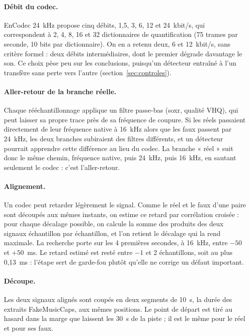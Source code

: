 \documentclass[a4paper, 11pt]{article}
\begin{document}
\paragraph{Débit du codec.} EnCodec 24~kHz propose cinq débits, 1,5, 3, 6, 12 et 24~kbit/s, qui correspondent à
2, 4, 8, 16 et 32 dictionnaires de quantification (75 trames par seconde, 10 bits par dictionnaire). On en a
retenu deux, 6 et 12~kbit/s, sans critère formel : deux débits intermédiaires, dont le premier dégrade davantage
le son. Ce choix pèse peu sur les conclusions, puisqu'un détecteur entraîné à l'un transfère sans perte vers
l'autre (section~\ref{sec:controles}).

\paragraph{Aller-retour de la branche réelle.} Chaque rééchantillonnage applique un filtre passe-bas (soxr,
qualité VHQ), qui peut laisser sa propre trace près de sa fréquence de coupure. Si les réels passaient
directement de leur fréquence native à 16~kHz alors que les faux passent par 24~kHz, les deux branches
subiraient des filtres différents, et un détecteur pourrait apprendre cette différence au lieu du codec. La
branche « réel » suit donc le même chemin, fréquence native, puis 24~kHz, puis 16~kHz, en sautant seulement le
codec : c'est l'aller-retour.

\paragraph{Alignement.} Un codec peut retarder légèrement le signal. Comme le réel et le faux d'une paire sont
découpés aux mêmes instants, on estime ce retard par corrélation croisée : pour chaque décalage possible, on
calcule la somme des produits des deux signaux échantillon par échantillon, et l'on retient le décalage qui
la rend maximale. La recherche porte sur les 4 premières secondes, à 16~kHz, entre $-50$ et $+50$~ms. Le retard
estimé est resté entre $-1$ et 2 échantillons, soit au plus 0,13~ms : l'étape sert de garde-fou plutôt qu'elle
ne corrige un défaut important.

\paragraph{Découpe.} Les deux signaux alignés sont coupés en deux segments de 10~s, la durée des extraits
FakeMusicCaps, aux mêmes positions. Le point de départ est tiré au hasard dans la marge que laissent les 30~s
de la piste ; il est le même pour le réel et pour ses faux.
\end{document}
